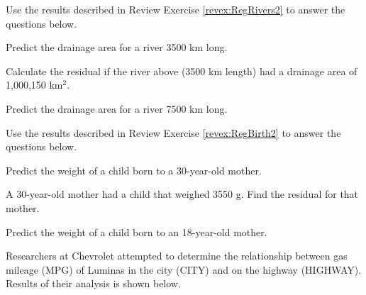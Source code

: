 \documentclass[10pt,openany]{book}\usepackage[]{graphicx}\usepackage[]{color}
\begin{document}
\newpage
\begin{exsection}
  \item \label{revex:RegRivers3} Use the results described in Review Exercise \ref{revex:RegRivers2} to answer the questions below. 
    \begin{Enumerate}
      \item Predict the drainage area for a river 3500 km long.
      \item Calculate the residual if the river above (3500 km length) had a drainage area of 1,000,150 km$^{2}$.
      \item Predict the drainage area for a river 7500 km long.
    \end{Enumerate}

  \item \label{revex:RegBirth3} Use the results described in Review Exercise \ref{revex:RegBirth2} to answer the questions below. 
    \begin{Enumerate}
      \item Predict the weight of a child born to a 30-year-old mother.
      \item A 30-year-old mother had a child that weighed 3550 g.  Find the residual for that mother.
      \item Predict the weight of a child born to an 18-year-old mother.
    \end{Enumerate}

  \item \label{revex:RegLumina} Researchers at Chevrolet attempted to determine the relationship between gas mileage (MPG) of Luminas in the city (CITY) and on the highway (HIGHWAY).  Results of their analysis is shown below.  


\end{exsection}
\end{document}
